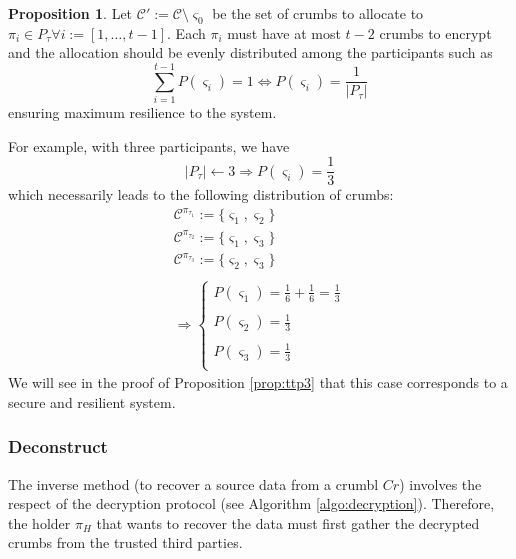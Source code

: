 \documentclass[twoside,twocolumn]{article}
\theoremstyle{definition}
\newtheorem{proposition}{Proposition}
\theoremstyle{remark}
\begin{document}
\begin{proposition}
    \label{prop:allocation}
    Let $\mathcal{C}' := \mathcal{C} \setminus \varsigma_0$ be the set of crumbs to allocate to $\pi_i \in P_\tau \forall i := [1, \dots, t-1]$.
    Each $\pi_i$ must have at most $t-2$ crumbs to encrypt and the allocation should be evenly distributed among the participants such as 
    \begin{equation}
        \label{eq:allocation}
        \sum_{i=1}^{t-1} P(\varsigma_i) = 1 \iff P(\varsigma_i) = \frac{1}{|P_\tau|}
    \end{equation}  
    ensuring maximum resilience to the system.

    For example, with three participants, we have $$
    |P_\tau| \gets 3 \Rightarrow P(\varsigma_i) = \frac{1}{3}
    $$
    which necessarily leads to the following distribution of crumbs:$$
        \begin{array}{l}
            \mathcal{C}^{\pi_{\tau_1}} := \{ \varsigma_1, \varsigma_2 \} \\
            \mathcal{C}^{\pi_{\tau_2}} := \{ \varsigma_1, \varsigma_3 \} \\
            \mathcal{C}^{\pi_{\tau_3}} := \{ \varsigma_2, \varsigma_3 \} \\ \\
            \Rightarrow \left\{
                \begin{array}{l}
                    P(\varsigma_1) = \frac{1}{6} + \frac{1}{6} = \frac{1}{3} \\ \\
                    P(\varsigma_2) = \frac{1}{3} \\ \\
                    P(\varsigma_3) = \frac{1}{3} \\
                \end{array}
            \right.
        \end{array}
    $$
    We will see in the proof of Proposition \ref{prop:ttp3} that this case corresponds to a secure and resilient system.
\end{proposition}

\subsubsection{Deconstruct}

The inverse method (to recover a source data from a crumbl $Cr$) involves the respect of the decryption protocol (see Algorithm \ref{algo:decryption}).
Therefore, the holder $\pi_H$ that wants to recover the data must first gather the decrypted crumbs from the trusted third parties.
\end{document}
